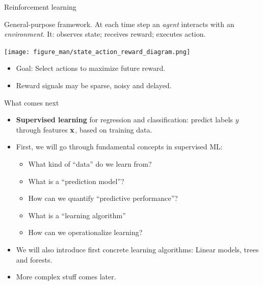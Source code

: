 \documentclass[11pt,compress,t,notes=noshow, xcolor=table]{beamer}
\begin{document}
\begin{vbframe}{Reinforcement learning}

General-purpose framework.
At each time step an \emph{agent} interacts with an \emph{environment}. 
It: observes state; receives reward; executes action.

\begin{center}
  \texttt{[image: figure\_man/state\_action\_reward\_diagram.png]}
\end{center}


\begin{itemize}
\item Goal: Select actions to maximize future reward.
\item Reward signals may be sparse, noisy and delayed.
\end{itemize}

\end{vbframe}





\begin{frame}{What comes next}

\begin{itemize}

\item \textbf{Supervised learning} for regression 
and classification: predict labels $y$ through features $\mathbf{x}$, based on training data.
  
  \item First, we will go through fundamental concepts in supervised ML: 
  \begin{itemize}
  
    \item What kind of ``data'' do we learn from?
    \item What is a ``prediction model''?
    \item How can we quantify ``predictive performance''?
    \item What is a ``learning algorithm'' 
    \item How can we operationalize learning?
  
  \end{itemize}
  
  \item We will also introduce first concrete learning algorithms: 
  Linear models, trees and forests. 
  
  \item More complex stuff comes later.
  
\end{itemize}

\end{frame}



\endlecture
\end{document}
